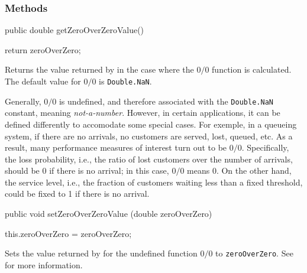 \subsubsection*{Methods}
\begin{code}

   public double getZeroOverZeroValue()\begin{hide} {
      return zeroOverZero;
   }\end{hide}
\end{code}
\begin{tabb}   Returns the value returned by  in the
 case where the $0/0$ function is calculated.
 The default value for $0/0$ is \texttt{Double.NaN}.

 Generally, $0/0$ is undefined, and therefore associated with the \texttt{Double.NaN}
  constant, meaning \emph{not-a-number}.
 However, in certain applications, it can be defined differently to accomodate some special cases.
 For exemple, in a queueing system, if there are no arrivals, no customers are served,
 lost, queued, etc.  As a result, many performance measures of interest turn out to be
 $0/0$.  Specifically, the loss probability, i.e., the ratio of
 lost customers over the number of arrivals, should be 0 if there is no arrival;
 in this case, $0/0$ means 0.
 On the other hand, the service level, i.e., the fraction of customers waiting less than
 a fixed threshold, could be fixed to 1 if there is no arrival.
\end{tabb}
\begin{htmlonly}
\end{htmlonly}
\begin{code}

   public void setZeroOverZeroValue (double zeroOverZero)\begin{hide} {
      this.zeroOverZero = zeroOverZero;
   }\end{hide}
\end{code}
\begin{tabb}   Sets the value returned by  for
 the undefined function $0/0$ to \texttt{zeroOverZero}.
 See  for more information.
\end{tabb}
\begin{htmlonly}
\end{htmlonly}
